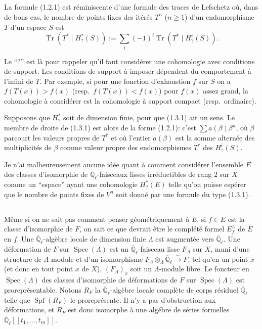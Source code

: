 \documentclass[11pt,a4paper]{article}
\theoremstyle{plain}
\theoremstyle{definition}
\DeclareMathOperator{\Spec}{Spec}
\DeclareMathOperator{\Specf}{Spf}
\DeclareMathOperator{\Tr}{Tr}
\newcommand{\Ql}{\overline{\mathbb{Q}}_\ell}
\begin{document}
\subsection{}
La formule (1.2.1) est r\'eminiscente d'une formule des traces de Lefschetz o\`u, dans de bons cas, le nombre de points fixes des it\'er\'es $T^n$ ($n \geq 1$) d'un endomorphisme $T$ d'un espace $S$ est
\begin{equation}
\Tr(T^* \mid H^*_?(S)) := \sum_i (-1)^i \Tr(T^* \mid H^i_?(S)).
\tag{1.3.1}
\end{equation}

Le ``$?$'' est l\`a pour rappeler qu'il faut consid\'erer une cohomologie avec conditions de support. Les conditions de support \`a imposer d\'ependent du comportement \`a l'infini de $T$. Par exemple, si pour une fonction d'exhaustion $f$ sur $S$ on a $f(T(x)) > f(x)$ (resp.\ $f(T(x)) < f(x)$) pour $f(x)$ assez grand, la cohomologie \`a consid\'erer est la cohomologie \`a support compact (resp.\ ordinaire).

Supposons que $H^*_?$ soit de dimension finie, pour que (1.3.1) ait un sens. Le membre de droite de (1.3.1) est alors de la forme (1.2.1): c'est $\sum a(\beta)\beta^n$, o\`u $\beta$ parcourt les valeurs propres de $T^*$ et o\`u l'entier $a(\beta)$ est la somme altern\'ee des multiplicit\'es de $\beta$ comme valeur propre des endomorphismes $T^*$ des $H^i_?(S)$.

Je n'ai malheureusement aucune id\'ee quant \`a comment consid\'erer l'ensemble $E$ des classes d'isomorphie de $\Ql$-faisceaux lisses irr\'eductibles de rang $2$ sur $X$ comme un ``espace'' ayant une cohomologie $H^*_?(E)$ telle qu'on puisse esp\'erer que le nombre de points fixes de $V^n$ soit donn\'e par une formule du type (1.3.1).

\subsection{}
M\^eme si on ne sait pas comment penser g\'eom\'etriquement \`a $E$, si $f \in E$ est la classe d'isomorphie de $F$, on sait ce que devrait \^etre le compl\'et\'e formel $E^\wedge_f$ de $E$ en $f$. Une $\Ql$-alg\`ebre locale de dimension finie $\Lambda$ est augment\'ee vers $\Ql$. Une d\'eformation de $F$ sur $\Spec(\Lambda)$ est un $\Ql$-faisceau lisse $F_\Lambda$ sur $X$, muni d'une structure de $\Lambda$-module et d'un isomorphisme $F_\Lambda \otimes_\Lambda \Ql \xrightarrow{\sim} F$, tel qu'en un point $x$ (et donc en tout point $x$ de $X$), $(F_\Lambda)_x$ soit un $\Lambda$-module libre. Le foncteur en $\Spec(\Lambda)$ des classes d'isomorphie de d\'eformations de $F$ sur $\Spec(\Lambda)$ est prorepr\'esentable. Notons $R_F$ la $\Ql$-alg\`ebre locale compl\`ete de corps r\'esiduel $\Ql$ telle que $\Specf(R_F)$ le prorepr\'esente. Il n'y a pas d'obstruction aux d\'eformations, et $R_F$ est donc isomorphe \`a une alg\'ebre de s\'eries formelles $\Ql[[t_1,\ldots,t_m]]$.
\end{document}
